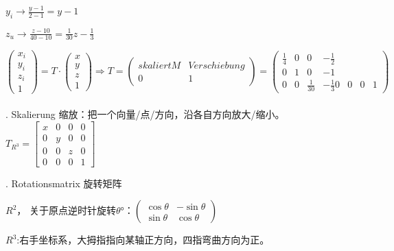 \documentclass[fleqn]{article}
\begin{document}
$y_i \rightarrow \frac{y-1}{2-1} = y-1$

$z_u \rightarrow \frac{z-10}{40-10}=\frac{1}{30}z-\frac{1}{3}$

$\begin{pmatrix}
    x_i\\y_i\\z_i\\1
\end{pmatrix}=T\cdot\begin{pmatrix}
    x\\y\\z\\1
\end{pmatrix}\Rightarrow T=\begin{pmatrix}
    skaliert M&Verschiebung\\
    0&1
\end{pmatrix}=\begin{pmatrix}
    \frac{1}{4}&0&0&-\frac{1}{2}\\
    0&1&0&-1\\
    0&0&\frac{1}{30}&-\frac{1}{3}
    0&0&0&1
\end{pmatrix}$
\\
\\
. Skalierung 缩放：把一个向量/点/方向，沿各自方向放大/缩小。$T_{R^3}=\begin{bmatrix}
    x&0&0&0\\
    0&y&0&0\\
    0&0&z&0\\
    0&0&0&1
\end{bmatrix}$

. Rotationsmatrix 旋转矩阵

$R^2$，
关于原点逆时针旋转$\theta$°：$\begin{pmatrix}
    \cos\theta&-\sin\theta\\
    \sin\theta&\cos\theta
\end{pmatrix}$

$R^3$:右手坐标系，大拇指指向某轴正方向，四指弯曲方向为正。
\end{document}
